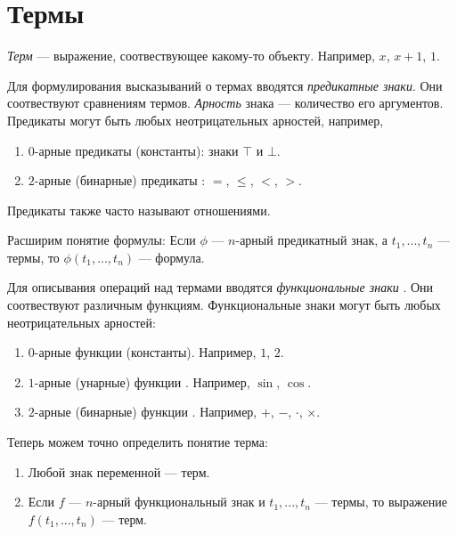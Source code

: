 \pagebreak

\section{Термы}

 {\it Терм} --- выражение, соотвествующее какому-то объекту.
Например, $x$, $x+1$, $1$.

Для формулирования высказываний о термах вводятся
{\it предикатные знаки}.
Они соотвествуют сравнениям термов.
{\it Арность}
знака --- количество его аргументов.
Предикаты могут быть любых неотрицательных арностей, например,
\begin{enumerate}
	\item{}$0$-арные предикаты (константы): знаки $\top$ и $\bot$.
	\item{}$2$-арные (бинарные) предикаты
	: $=$, $\leq$, $<$, $>$.
\end{enumerate}
Предикаты также часто называют отношениями.

Расширим понятие формулы: Если $\phi$ --- $n$-арный предикатный знак,
а $t_1,...,t_{n}$ --- термы, то $\phi(t_1,...,t_{n})$ --- формула.

Для описывания операций над термами вводятся {\it функциональные знаки}
.
Они соотвествуют различным функциям. Функциональные знаки могут быть любых
неотрицательных арностей:
\begin{enumerate}
	\item{}$0$-арные функции (константы). Например, $1$, $2$.
	\item{}$1$-арные (унарные) функции
	.
	Например, $\sin$, $\cos$.
	\item{}$2$-арные (бинарные) функции
	.
	Например, $+$, $-$, $\cdot$, $\times$.
\end{enumerate}

Теперь можем точно определить понятие терма:
\begin{enumerate}
	\item{}Любой знак переменной --- терм.

	\item{}Если $f$ --- $n$-арный функциональный знак и $t_1,...,t_{n}$ --- термы,
	то выражение $f(t_1,...,t_{n})$ --- терм.
\end{enumerate}

